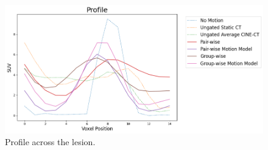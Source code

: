 \documentclass[misc, color=UCLburgundy, margin=1cm]{uclposter}
\begin{document}
\begin{multicols}{4}
            \begin{figure}[H]
                \centering
                \includegraphics[width=1.0\linewidth]{profile.png}
                \begin{highlightbox}[UCLlightblue]
                    \captionsetup{singlelinecheck=false, justification=centering}
                    \caption{Profile across the lesion.}
                \end{highlightbox}
            \end{figure}
            
            \vspace{-1.0cm}
            

\end{multicols}
\end{document}
